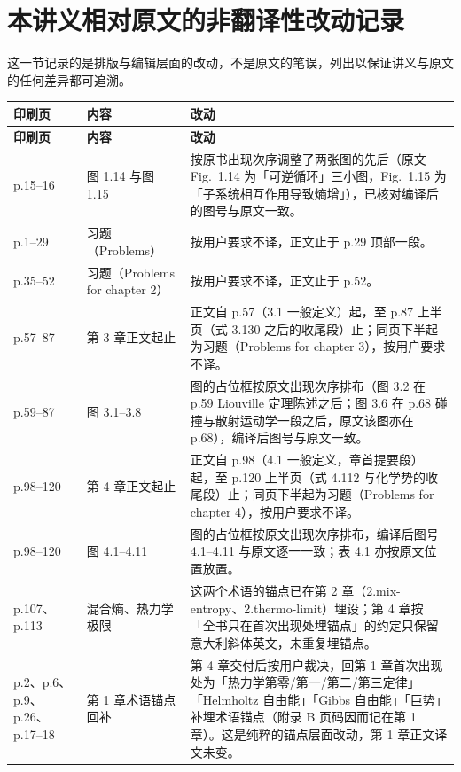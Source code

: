 \documentclass[11pt,a4paper,oneside,fontset=fandol]{ctexart}
\begin{document}
\section*{本讲义相对原文的非翻译性改动记录}

这一节记录的是排版与编辑层面的改动，不是原文的笔误，列出以保证讲义与原文的任何差异都可追溯。

\small
\begin{longtable}{@{}p{3.4cm} p{3.4cm} p{7.4cm}@{}}
  \toprule
  \textbf{印刷页} & \textbf{内容} & \textbf{改动} \\
  \midrule
  \endfirsthead
  \toprule
  \textbf{印刷页} & \textbf{内容} & \textbf{改动} \\
  \midrule
  \endhead
  \bottomrule
  \endlastfoot
  p.15--16 & 图 1.14 与图 1.15 & 按原书出现次序调整了两张图的先后（原文 Fig.~1.14 为「可逆循环」三小图，Fig.~1.15 为「子系统相互作用导致熵增」），已核对编译后的图号与原文一致。\\
  \midrule
  p.1--29 & 习题（Problems） & 按用户要求不译，正文止于 p.29 顶部一段。\\
  \midrule
  p.35--52 & 习题（Problems for chapter 2） & 按用户要求不译，正文止于 p.52。\\
  \midrule
  p.57--87 & 第 3 章正文起止 & 正文自 p.57（3.1 一般定义）起，至 p.87 上半页（式 3.130 之后的收尾段）止；同页下半起为习题（Problems for chapter 3），按用户要求不译。\\
  \midrule
  p.59--87 & 图 3.1--3.8 & 图的占位框按原文出现次序排布（图 3.2 在 p.59 Liouville 定理陈述之后；图 3.6 在 p.68 碰撞与散射运动学一段之后，原文该图亦在 p.68），编译后图号与原文一致。\\
  \midrule
  p.98--120 & 第 4 章正文起止 & 正文自 p.98（4.1 一般定义，章首提要段）起，至 p.120 上半页（式 4.112 与化学势的收尾段）止；同页下半起为习题（Problems for chapter 4），按用户要求不译。\\
  \midrule
  p.98--120 & 图 4.1--4.11 & 图的占位框按原文出现次序排布，编译后图号 4.1--4.11 与原文逐一一致；表 4.1 亦按原文位置放置。\\
  \midrule
  p.107、p.113 & 混合熵、热力学极限 & 这两个术语的锚点已在第 2 章（2.mix-entropy、2.thermo-limit）埋设；第 4 章按「全书只在首次出现处埋锚点」的约定只保留意大利斜体英文，未重复埋锚点。\\
  \midrule
  p.2、p.6、p.9、p.26、p.17--18 & 第 1 章术语锚点回补 & 第 4 章交付后按用户裁决，回第 1 章首次出现处为「热力学第零/第一/第二/第三定律」「Helmholtz 自由能」「Gibbs 自由能」「巨势」补埋术语锚点（附录 B 页码因而记在第 1 章）。这是纯粹的锚点层面改动，第 1 章正文译文未变。\\

\end{longtable}
\end{document}
